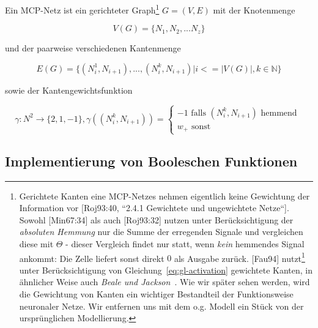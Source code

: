 \begin{definition} Ein MCP-Netz ist ein gerichteter Graph\footnote{
    Gerichtete Kanten eine MCP-Netzes nehmen eigentlich keine Gewichtung der Information vor [Roj93:40, ``2.4.1 Gewichtete und ungewichtete Netze``]. Sowohl [Min67:34] als auch [Roj93:32] nutzen unter Berücksichtigung der \textit{absoluten Hemmung} nur die Summe der erregenden Signale und vergleichen diese mit $\Theta$ - dieser Vergleich findet nur statt, wenn \textit{kein} hemmendes Signal ankommt: Die Zelle liefert sonst direkt $0$ als Ausgabe zurück. [Fau94] nutzt\footnote{
        Gewichte sind in absolut hemmenden Leitungen unsinnig nach [Roj93:42, Abs. 1]
    } unter Berücksichtigung von Gleichung~\ref{eq:gl-activation} gewichtete Kanten, in ähnlicher Weise auch \textit{Beale und Jackson}~\cite[41]{BJ90}. Wie wir später sehen werden, wird die Gewichtung von Kanten ein wichtiger Bestandteil der Funktionsweise neuronaler Netze. Wir entfernen uns mit dem o.g. Modell ein Stück von der ursprünglichen Modellierung.
} $G = (V, E)$ mit der Knotenmenge

\begin{equation}
V(G) =\{N_1, N_2, ... N_z\}
\end{equation}

und der paarweise verschiedenen Kantenmenge

\begin{equation}
E(G) = \{ (N^1_i, N_{i+1}), ..., (N^k_i, N_{i+1}) | i <= |V(G)|, k \in \mathbb{N} \}
\end{equation}

sowie der Kantengewichtsfunktion



\begin{equation}
\gamma: N^2 \to \{2, 1, -1\}, \gamma((N^k_i, N_{i+1})) = \begin{cases}
                                                              -1 \text{ falls } (N^k_i, N_{i+1})  \text{ hemmend } \\
                                                              w_+  \text{ sonst}
\end{cases}
\end{equation}
\label{def:mcpnetz}
\end{definition}



\subsection{Implementierung von Booleschen Funktionen}\label{seq-mcpbool}

